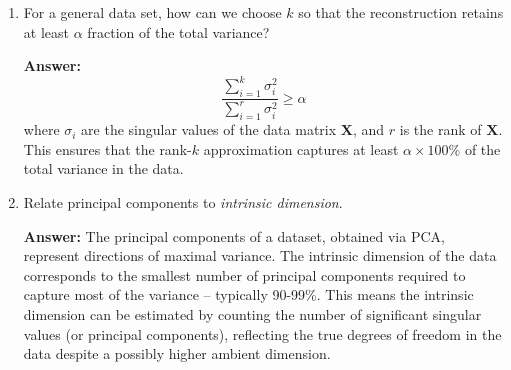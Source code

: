 \documentclass[11pt]{article}
\begin{document}
\begin{enumerate}[label=(\alph*)]
    \begin{align*}
        ||\mathbf{X} - \mathbf{X}_1||_F &= \sqrt{\Sigma_{i=1}^m \Sigma_{j=1}^n |x_{ij}|^2}
    \end{align*}

    \item For a general data set, how can we choose \(k\) so that the reconstruction retains at least \(\alpha\) fraction of the total variance?
    
    \textbf{Answer:}
    \[
        \frac{\sum_{i=1}^k \sigma_i^2}{\sum_{i=1}^r \sigma_i^2} \geq \alpha
    \]  
    where \( \sigma_i \) are the singular values of the data matrix \( \mathbf{X} \), and \( r \) is the rank of \( \mathbf{X} \). This ensures that the rank-\( k \) approximation captures at least \( \alpha \times 100\% \) of the total variance in the data.

    \item Relate principal components to \textit{intrinsic dimension}.

    \textbf{Answer:} The principal components of a dataset, obtained via PCA, represent directions of maximal variance.
    The intrinsic dimension of the data corresponds to the smallest number of principal components required to capture most of the variance -- typically 90-99\%. 
    This means the intrinsic dimension can be estimated by counting the number of significant singular values (or principal components), reflecting the true degrees of freedom in the data despite a possibly higher ambient dimension.
\end{enumerate}
\end{document}
